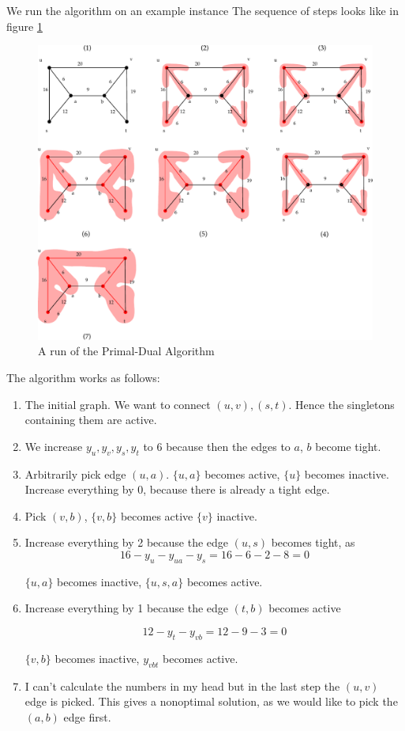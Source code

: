 \begin{Ex} We run the algorithm on an example instance
The sequence of steps looks like in figure \ref{fig:steinerTreePrimalDual}

\begin{figure}[hbt]
\begin{center}
\includegraphics[width=\linewidth]{./images/steinerPrimalDual}
\end{center}
\caption{A run of the Primal-Dual Algorithm}
\label{fig:steinerTreePrimalDual}
\end{figure}

The algorithm works as follows:

\begin{enumerate}
\item The initial graph. We want to connect $(u,v),(s,t)$. Hence the singletons containing them are active.
\item We increase $y_u,y_v,y_s,y_t$ to 6 because then the edges to $a$, $b$ become tight.
\item Arbitrarily pick edge $(u,a)$. $\{u,a\}$ becomes active, $\{u\}$ becomes inactive. Increase everything by $0$, because there is already a tight edge.
\item Pick $(v,b)$, $\{v,b\}$ becomes active $\{v\}$ inactive.
\item Increase everything by 2 because the edge $(u,s)$ becomes tight, as 
\[16 - y_{u} - y_{ua} - y_{s} = 16 - 6 - 2 - 8 = 0\]

$\{u,a\}$ becomes inactive, $\{u,s,a\}$ becomes active.
\item Increase everything by 1 because the edge $(t,b)$ becomes active

\[12 - y_t - y_{vb} = 12 - 9 - 3 = 0\]

$\{v,b\}$ becomes inactive, $y_{vbt}$ becomes active.
\item I can't calculate the numbers in my head but in the last step the $(u,v)$ edge is picked. This gives a nonoptimal solution, as we would like to pick the $(a,b)$ edge first.
\end{enumerate}
\end{Ex}

